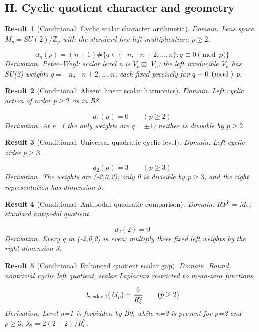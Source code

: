 \documentclass[aps,prd,onecolumn,notitlepage,groupedaddress,11pt]{revtex4-2}
\newtheorem{result}{Result}
\begin{document}
\subsection{II. Cyclic quotient character and geometry}
\begin{result}[\textsf{Conditional}: Cyclic scalar character arithmetic]\label{bridge:8}
\textit{Domain.} Lens space \(M_p=SU(2)/\mathbb{Z}_p\) with the standard free left multiplication; \(p\ge2\).\par
\begin{equation}\label{bridgeeq:8}
d_n(p)=(n+1)\#\{q\in\{-n,-n+2,\ldots,n\}:q\equiv0\pmod p\}
\end{equation}
\textit{Derivation.} Peter--Weyl: scalar level n is \(V_n\boxtimes\) \(V_n\); the left irreducible \(V_n\) has SU(2) weights \(q=-n,-n+2,\ldots,n\), each fixed precisely for \(q\equiv0\pmod\) p.
\end{result}
\begin{result}[\textsf{Conditional}: Absent linear scalar harmonics]\label{bridge:9}
\textit{Domain.} Left cyclic action of order \(p\ge2\) as in B8.\par
\begin{equation}\label{bridgeeq:9}
d_1(p)=0\qquad(p\ge2)
\end{equation}
\textit{Derivation.} At n=1 the only weights are \(q=\pm1\); neither is divisible by \(p\ge2\).
\end{result}
\begin{result}[\textsf{Conditional}: Universal quadratic cyclic level]\label{bridge:10}
\textit{Domain.} Left cyclic order \(p\ge3\).\par
\begin{equation}\label{bridgeeq:10}
d_2(p)=3\qquad(p\ge3)
\end{equation}
\textit{Derivation.} The weights are (-2,0,2); only 0 is divisible by \(p\ge3\), and the right representation has dimension 3.
\end{result}
\begin{result}[\textsf{Conditional}: Antipodal quadratic comparison]\label{bridge:11}
\textit{Domain.} \(RP^3=M_2\), standard antipodal quotient.\par
\begin{equation}\label{bridgeeq:11}
d_2(2)=9
\end{equation}
\textit{Derivation.} Every q in (-2,0,2) is even; multiply three fixed left weights by the right dimension 3.
\end{result}
\begin{result}[\textsf{Conditional}: Enhanced quotient scalar gap]\label{bridge:12}
\textit{Domain.} Round, nontrivial cyclic left quotient, scalar Laplacian restricted to mean-zero functions.\par
\begin{equation}\label{bridgeeq:12}
\lambda_{\rm scalar,1}(M_p)=\frac{6}{R_c^2}\qquad(p\ge2)
\end{equation}
\textit{Derivation.} Level n=1 is forbidden by B9, while n=2 is present for p=2 and \(p\ge3\); \(\lambda_2=2(2+2)/R_c^2\).
\end{result}
\end{document}
